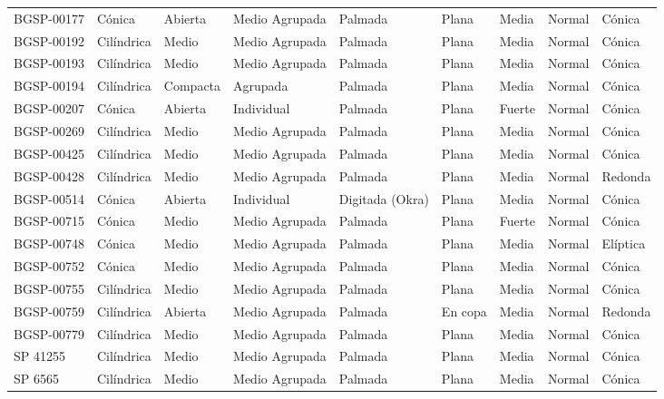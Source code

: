 \documentclass[12pt,oneside]{reedthesis}
\begin{document}
\begin{table}[!h]
{\begin{tabular}[t]{lllllllll}
BGSP-00177 & Cónica & Abierta & Medio Agrupada & Palmada & Plana & Media & Normal & Cónica\\
\addlinespace
BGSP-00192 & Cilíndrica & Medio & Medio Agrupada & Palmada & Plana & Media & Normal & Cónica\\
BGSP-00193 & Cilíndrica & Medio & Medio Agrupada & Palmada & Plana & Media & Normal & Cónica\\
BGSP-00194 & Cilíndrica & Compacta & Agrupada & Palmada & Plana & Media & Normal & Cónica\\
BGSP-00207 & Cónica & Abierta & Individual & Palmada & Plana & Fuerte & Normal & Cónica\\
BGSP-00269 & Cilíndrica & Medio & Medio Agrupada & Palmada & Plana & Media & Normal & Cónica\\
\addlinespace
BGSP-00425 & Cilíndrica & Medio & Medio Agrupada & Palmada & Plana & Media & Normal & Cónica\\
BGSP-00428 & Cilíndrica & Medio & Medio Agrupada & Palmada & Plana & Media & Normal & Redonda\\
BGSP-00514 & Cónica & Abierta & Individual & Digitada (Okra) & Plana & Media & Normal & Cónica\\
BGSP-00715 & Cónica & Medio & Medio Agrupada & Palmada & Plana & Fuerte & Normal & Cónica\\
BGSP-00748 & Cónica & Medio & Medio Agrupada & Palmada & Plana & Media & Normal & Elíptica\\
\addlinespace
BGSP-00752 & Cónica & Medio & Medio Agrupada & Palmada & Plana & Media & Normal & Cónica\\
BGSP-00755 & Cilíndrica & Medio & Medio Agrupada & Palmada & Plana & Media & Normal & Cónica\\
BGSP-00759 & Cilíndrica & Abierta & Medio Agrupada & Palmada & En copa & Media & Normal & Redonda\\
BGSP-00779 & Cilíndrica & Medio & Medio Agrupada & Palmada & Plana & Media & Normal & Cónica\\
SP 41255 & Cilíndrica & Medio & Medio Agrupada & Palmada & Plana & Media & Normal & Cónica\\
\addlinespace
SP 6565 & Cilíndrica & Medio & Medio Agrupada & Palmada & Plana & Media & Normal & Cónica\\
\bottomrule
\end{tabular}}
\end{table}
\end{document}
